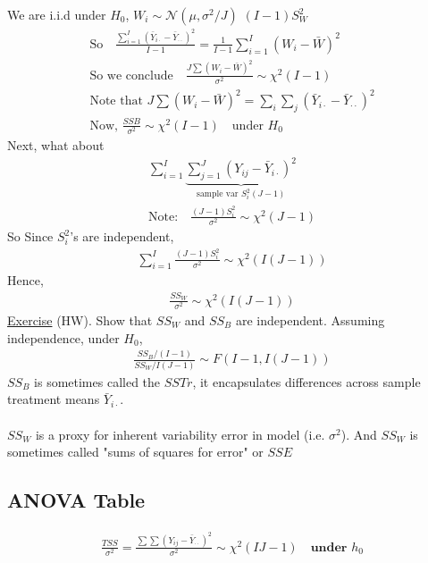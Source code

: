We are i.i.d under $H_0$, $W_i \sim \mathcal{N}(\mu, \sigma^2/J)$ \quad $(I-1)S_W^2$
\begin{gather*}
	\text{So} \quad \frac{\sum_{i=1}^I (\bar{Y}_{i \cdot} - \bar{Y}_{\cdot \cdot})^2}{I-1} = \frac{1}{I-1} \sum_{i=1}^I (W_i - \bar{W})^2\\
	\text{So we conclude} \quad \boxed{\frac{J \sum(W_i - \bar{W})^2}{\sigma^2} \sim \chi^2(I-1)}\\
	\text{Note that } J \sum(W_i - \bar{W})^2 = \sum_i \sum_j (\bar{Y}_{i \cdot} - \bar{Y}_{\cdot \cdot})^2\\
	\text{Now, } \frac{SSB}{\sigma^2} \sim \chi^2(I-1) \quad \text{under $H_0$}
\end{gather*}
Next, what about
\begin{gather*}
	\sum_{i=1}^I \underbrace{\sum_{j=1}^J (Y_{ij} - \bar{Y}_{i \cdot})^2}_{\text{sample var $S_i^2(J-1)$}}\\
	\text{Note:} \quad \frac{(J-1)S_i^2}{\sigma^2} \sim \chi^2(J-1)
\end{gather*}
So Since $S_i^2$'s are independent, 
\begin{gather*}
	\sum_{i=1}^{I} \frac{(J-1)S_i^2}{\sigma^2} \sim \chi^2 (I(J-1))
\end{gather*}
Hence,
\begin{gather*}
	\frac{SS_W}{\sigma^2} \sim \chi^2(I(J-1))
\end{gather*}
\underline{Exercise} (HW). Show that $SS_W$ and $SS_B$ are independent. Assuming independence, under $H_0$,
\begin{gather*}
	\frac{SS_B / (I-1)}{SS_W / I(J-1)} \sim F(I-1, I(J-1))
\end{gather*}
$SS_B$ is sometimes called the $SSTr$, it encapsulates differences across sample treatment means $\bar{Y}_{i \cdot}$.\\\\
$SS_W$ is a proxy for inherent variability error in model (i.e. $\sigma^2$). And $SS_W$ is sometimes called "sums of squares for error" or $SSE$
\subsection*{ANOVA Table}
\begin{gather*}
	\frac{TSS}{\sigma^2} = \frac{\sum \sum (Y_{ij} - \bar{Y}_{\cdot \cdot})^2}{\sigma^2} \sim \chi^2 (IJ - 1) \quad \textbf{under $h_0$}
\end{gather*}

